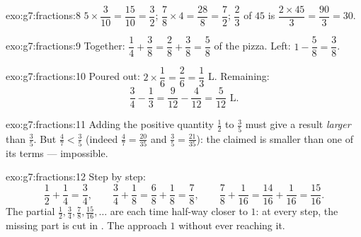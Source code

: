 \begin{solution}{exo:g7:fractions:8}
$5 \times \dfrac{3}{10} = \dfrac{15}{10} = \dfrac32$; \quad
$\dfrac78 \times 4 = \dfrac{28}{8} = \dfrac72$; \quad
$\dfrac23$ of $45$ is $\dfrac{2 \times 45}{3} = \dfrac{90}{3} = 30$.
\end{solution}

\begin{solution}{exo:g7:fractions:9}
Together: $\dfrac14 + \dfrac38 = \dfrac28 + \dfrac38 = \dfrac58$ of
the pizza. Left: $1 - \dfrac58 = \dfrac38$.
\end{solution}

\begin{solution}{exo:g7:fractions:10}
Poured out: $2 \times \dfrac16 = \dfrac26 = \dfrac13$ L. Remaining:
\[
\frac34 - \frac13 = \frac{9}{12} - \frac{4}{12} = \frac{5}{12}
\text{ L}.
\]
\end{solution}

\begin{solution}{exo:g7:fractions:11}
Adding the positive quantity $\frac12$ to $\frac35$ must give a result
\emph{larger} than $\frac35$. But $\frac47 < \frac35$ (indeed
$\frac47 = \frac{20}{35}$ and $\frac35 = \frac{21}{35}$): the claimed
 is smaller than one of its terms --- impossible.
\end{solution}

\begin{solution}{exo:g7:fractions:12}
Step by step:
\[
\frac12 + \frac14 = \frac34, \qquad
\frac34 + \frac18 = \frac68 + \frac18 = \frac78, \qquad
\frac78 + \frac1{16} = \frac{14}{16} + \frac1{16} = \frac{15}{16}.
\]
The partial  $\frac12, \frac34, \frac78, \frac{15}{16}, \dots$ are
each time half-way closer to $1$: at every step, the missing part is
cut in . The  approach $1$ without ever reaching it.
\end{solution}

